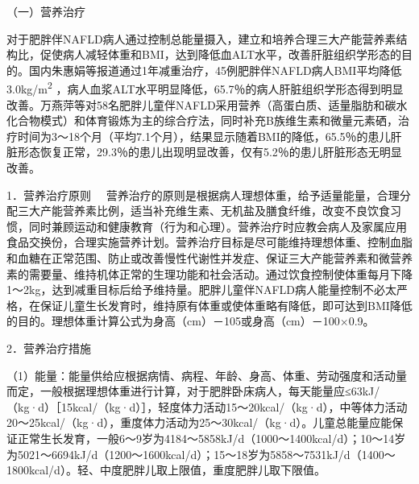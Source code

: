 （一）营养治疗

对于肥胖伴NAFLD病人通过控制总能量摄入，建立和培养合理三大产能营养素结构比，促使病人减轻体重和BMI，达到降低血ALT水平，改善肝脏组织学形态的目的。国内朱惠娟等报道通过1年减重治疗，45例肥胖伴NAFLD病人BMI平均降低3.0kg/m\textsuperscript{2}
，病人血浆ALT水平明显降低，65.7％的病人肝脏组织学形态得到明显改善。万燕萍等对58名肥胖儿童伴NAFLD采用营养（高蛋白质、适量脂肪和碳水化合物模式）和体育锻炼为主的综合疗法，同时补充B族维生素和微量元素硒，治疗时间为3～18个月（平均7.1个月），结果显示随着BMI的降低，65.5％的患儿肝脏形态恢复正常，29.3％的患儿出现明显改善，仅有5.2％的患儿肝脏形态无明显改善。

{1．营养治疗原则}
　营养治疗的原则是根据病人理想体重，给予适量能量，合理分配三大产能营养素比例，适当补充维生素、无机盐及膳食纤维，改变不良饮食习惯，同时兼顾运动和健康教育（行为和心理）。营养治疗时应教会病人及家属应用食品交换份，合理实施营养计划。营养治疗目标是尽可能维持理想体重、控制血脂和血糖在正常范围、防止或改善慢性代谢性并发症、保证三大产能营养素和微营养素的需要量、维持机体正常的生理功能和社会活动。通过饮食控制使体重每月下降1～2kg，达到减重目标后给予维持量。肥胖儿童伴NAFLD病人能量控制不必太严格，在保证儿童生长发育时，维持原有体重或使体重略有降低，即可达到BMI降低的目的。理想体重计算公式为身高（cm）－105或身高（cm）－100×0.9。

{2．营养治疗措施}

（1）能量：能量供给应根据病情、病程、年龄、身高、体重、劳动强度和活动量而定，一般根据理想体重进行计算，对于肥胖卧床病人，每天能量应≤63kJ/（kg·d）［15kcal/（kg·d）］，轻度体力活动15～20kcal/（kg·d），中等体力活动20～25kcal/（kg·d），重度体力活动为25～30kcal/（kg·d）。儿童总能量应能保证正常生长发育，一般6～9岁为4184～5858kJ/d（1000～1400kcal/d）；10～14岁为5021～6694kJ/d（1200～1600kcal/d）；15～18岁为5858～7531kJ/d（1400～1800kcal/d）。轻、中度肥胖儿取上限值，重度肥胖儿取下限值。

